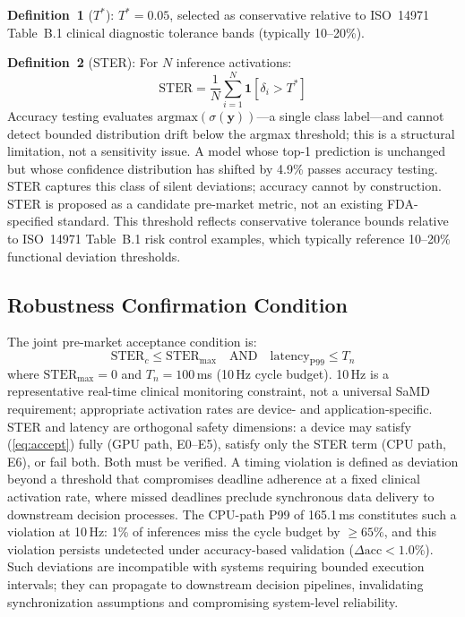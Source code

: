 \documentclass[journal,10pt,twocolumn]{IEEEtran}
\begin{document}
\textbf{Definition~1} ($T^*$): $T^* = 0.05$, selected as conservative
relative to ISO~14971 Table~B.1 clinical diagnostic tolerance bands
(typically 10--20\%).

\textbf{Definition~2} (STER): For $N$ inference activations:
\begin{equation}
  \mathrm{STER} = \frac{1}{N}\sum_{i=1}^{N}
    \mathbf{1}\!\left[\delta_i > T^*\right]
  \label{eq:ster}
\end{equation}
Accuracy testing evaluates $\mathrm{argmax}(\sigma(\mathbf{y}))$---a
single class label---and cannot detect bounded distribution drift below
the argmax threshold; this is a structural limitation, not a sensitivity issue.
A model whose top-1 prediction is unchanged but whose confidence
distribution has shifted by 4.9\% passes accuracy testing.
STER captures this class of silent deviations; accuracy cannot by construction.
STER is proposed as a candidate pre-market metric, not an existing
FDA-specified standard.
This threshold reflects conservative tolerance bounds relative to
ISO~14971 Table~B.1 risk control examples, which typically reference
10--20\% functional deviation thresholds.

\subsection{Robustness Confirmation Condition}

The joint pre-market acceptance condition is:
\begin{equation}
  \mathrm{STER}_c \leq \mathrm{STER}_{\max}
  \quad\text{AND}\quad
  \mathrm{latency}_{\mathrm{P99}} \leq T_n
  \label{eq:accept}
\end{equation}
where $\mathrm{STER}_{\max} = 0$ and $T_n = 100$\,ms (10\,Hz cycle budget).
10\,Hz is a representative real-time clinical monitoring constraint,
not a universal SaMD requirement; appropriate activation rates are
device- and application-specific.
STER and latency are orthogonal safety dimensions: a device may satisfy
(\ref{eq:accept}) fully (GPU path, E0--E5), satisfy only the STER term
(CPU path, E6), or fail both. Both must be verified.
A timing violation is defined as deviation beyond a threshold that
compromises deadline adherence at a fixed clinical activation rate,
where missed deadlines preclude synchronous data delivery to downstream
decision processes.
The CPU-path P99 of 165.1\,ms constitutes such a violation at 10\,Hz:
1\% of inferences miss the cycle budget by ${\geq}65\%$, and this
violation persists undetected under accuracy-based validation
($\Delta\mathrm{acc}{<}1.0\%$).
Such deviations are incompatible with systems requiring bounded
execution intervals; they can propagate to downstream decision
pipelines, invalidating synchronization assumptions and compromising
system-level reliability.
\end{document}

